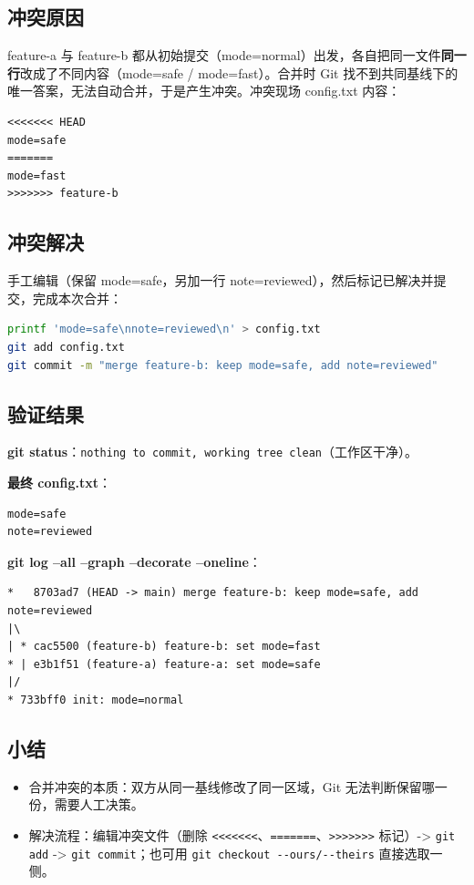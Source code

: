 \documentclass[UTF8,fontset=ubuntu]{ctexart}
\begin{document}
\subsection{冲突原因}
feature-a 与 feature-b 都从初始提交（mode=normal）出发，各自把同一文件\textbf{同一行}改成了不同内容（mode=safe / mode=fast）。合并时 Git 找不到共同基线下的唯一答案，无法自动合并，于是产生冲突。冲突现场 config.txt 内容：
\begin{lstlisting}
<<<<<<< HEAD
mode=safe
=======
mode=fast
>>>>>>> feature-b
\end{lstlisting}

\subsection{冲突解决}
手工编辑（保留 mode=safe，另加一行 note=reviewed），然后标记已解决并提交，完成本次合并：
\begin{lstlisting}[language=bash]
printf 'mode=safe\nnote=reviewed\n' > config.txt
git add config.txt
git commit -m "merge feature-b: keep mode=safe, add note=reviewed"
\end{lstlisting}

\subsection{验证结果}
\textbf{git status}：\lstinline|nothing to commit, working tree clean|（工作区干净）。

\textbf{最终 config.txt}：
\begin{lstlisting}
mode=safe
note=reviewed
\end{lstlisting}

\textbf{git log --all --graph --decorate --oneline}：
\begin{lstlisting}
*   8703ad7 (HEAD -> main) merge feature-b: keep mode=safe, add note=reviewed
|\
| * cac5500 (feature-b) feature-b: set mode=fast
* | e3b1f51 (feature-a) feature-a: set mode=safe
|/
* 733bff0 init: mode=normal
\end{lstlisting}

\subsection{小结}
\begin{itemize}
\item 合并冲突的本质：双方从同一基线修改了同一区域，Git 无法判断保留哪一份，需要人工决策。
\item 解决流程：编辑冲突文件（删除 \lstinline|<<<<<<<|、\lstinline|=======|、\lstinline|>>>>>>>| 标记）-> \lstinline|git add| -> \lstinline|git commit|；也可用 \lstinline|git checkout --ours/--theirs| 直接选取一侧。
\end{itemize}
\end{document}
